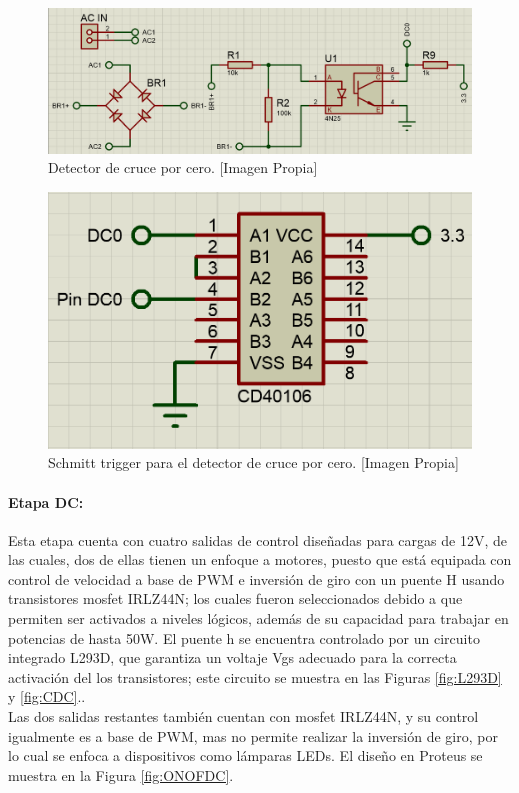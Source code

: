 		\begin{figure}[H]
			\centering
			\caption[Detector de cruce por cero.]{Detector de cruce por cero.  [Imagen Propia]}
			\label{fig:DC01}
			\includegraphics[width=0.85\linewidth]{Imagenes/DC01}
		\end{figure}
	
		\begin{figure}[H]
			\centering
			\caption[Schmitt trigger para el detector de cruce por cero.]{Schmitt trigger para el detector de cruce por cero. [Imagen Propia]}
			\label{fig:DC02}
			\includegraphics[width=0.5\linewidth]{Imagenes/DC02}
		\end{figure}
	
	\paragraph{Etapa DC:}
		Esta etapa cuenta con cuatro salidas de control diseñadas para cargas de 12V, de las cuales, dos de ellas tienen un enfoque a motores, puesto que está equipada con control de velocidad a base de PWM e inversión de giro con un puente H usando transistores mosfet IRLZ44N; los cuales fueron seleccionados debido a que permiten ser activados a niveles lógicos, además de su capacidad para trabajar en potencias de hasta 50W. El puente h se encuentra controlado por un circuito integrado L293D, que garantiza un voltaje Vgs adecuado para la correcta activación del los transistores; este circuito se muestra en las Figuras \ref{fig:L293D} y \ref{fig:CDC}.\cite{IRL}.\\
		
		Las dos salidas restantes también cuentan con mosfet IRLZ44N, y su control igualmente es a base de PWM, mas no permite realizar la inversión de giro, por lo cual se enfoca a dispositivos como lámparas LEDs. El diseño en Proteus se muestra en la Figura \ref{fig:ONOFDC}.\\
		
